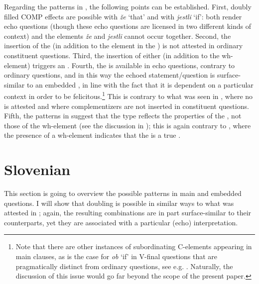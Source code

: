 \documentclass[output=paper,modfonts, hidelinks, newtxmath]{langscibook}
\begin{document}
\ea
	\z 
\z 

\noindent Regarding the  patterns in , the following points can be established. First, doubly filled COMP effects are possible with \textit{že} `that' and with \textit{jestli} `if': both render echo questions (though these echo questions are licensed in two different kinds of context) and the elements \textit{že} and \textit{jestli} cannot occur together. Second, the insertion of the  (in addition to the element in the ) is not attested in ordinary constituent questions. Third, the insertion of either  (in addition to the wh-element) triggers an . Fourth, the  is available in  echo questions, contrary to ordinary  questions, and in this way the echoed statement/question is surface-similar to an embedded , in line with the fact that it is dependent on a particular context in order to be felicitous.\footnote{Note that there are other instances of subordinating C-elements appearing in main clauses, as is the case for  \textit{ob} `if' in V-final  questions that are pragmatically distinct from ordinary questions, see e.g. \citet{zimmermann2013}. Naturally, the discussion of this issue would go far beyond the scope of the present paper.} This is contrary to what was seen in , where no  is attested and where complementizers are not inserted in  constituent questions. Fifth, the patterns in  suggest that the  type reflects the properties of the , not those of the wh-element (see the discussion in ); this is again contrary to , where the presence of a wh-element indicates that the  is a true .

\section{Slovenian}
This section is going to overview the possible patterns in  main and embedded questions. I will show that doubling is possible in similar ways to what was attested in ; again, the resulting combinations are in part surface-similar to their  counterparts, yet they are associated with a particular (echo) interpretation.
\end{document}
